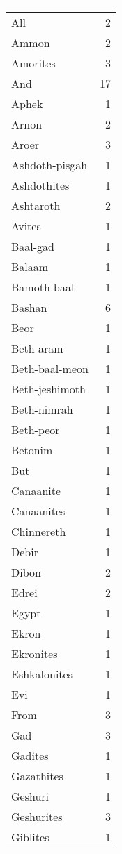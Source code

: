 \begin{center}
\begin{longtable}{l|r}
\hline \multicolumn{2}{c}{{ }} \\ \hline
\endfoot 
All & 2\\ \hline 
Ammon & 2\\ \hline 
Amorites & 3\\ \hline 
And & 17\\ \hline 
Aphek & 1\\ \hline 
Arnon & 2\\ \hline 
Aroer & 3\\ \hline 
Ashdoth-pisgah & 1\\ \hline 
Ashdothites & 1\\ \hline 
Ashtaroth & 2\\ \hline 
Avites & 1\\ \hline 
Baal-gad & 1\\ \hline 
Balaam & 1\\ \hline 
Bamoth-baal & 1\\ \hline 
Bashan & 6\\ \hline 
Beor & 1\\ \hline 
Beth-aram & 1\\ \hline 
Beth-baal-meon & 1\\ \hline 
Beth-jeshimoth & 1\\ \hline 
Beth-nimrah & 1\\ \hline 
Beth-peor & 1\\ \hline 
Betonim & 1\\ \hline 
But & 1\\ \hline 
Canaanite & 1\\ \hline 
Canaanites & 1\\ \hline 
Chinnereth & 1\\ \hline 
Debir & 1\\ \hline 
Dibon & 2\\ \hline 
Edrei & 2\\ \hline 
Egypt & 1\\ \hline 
Ekron & 1\\ \hline 
Ekronites & 1\\ \hline 
Eshkalonites & 1\\ \hline 
Evi & 1\\ \hline 
From & 3\\ \hline 
Gad & 3\\ \hline 
Gadites & 1\\ \hline 
Gazathites & 1\\ \hline 
Geshuri & 1\\ \hline 
Geshurites & 3\\ \hline 
Giblites & 1\\ \hline 

\end{longtable}
\end{center}
